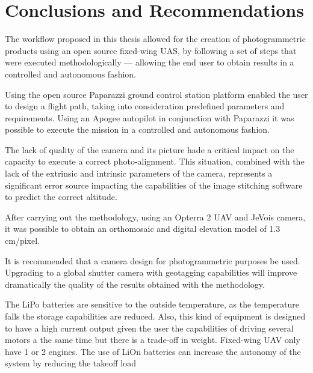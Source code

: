 \section{Conclusions and Recommendations}
The workflow proposed in this thesis allowed for the creation of photogrammetric products using an open source fixed-wing UAS, by following a set of steps that were executed methodologically — allowing the end user to obtain results in a controlled and autonomous fashion.

Using the open source Paparazzi ground control station platform enabled the user to design a flight path, taking into consideration predefined parameters and requirements. Using an Apogee autopilot in conjunction with Paparazzi it was possible to execute the mission in a controlled and autonomous fashion.

The lack of quality of the camera and its picture hade a critical impact on the capacity to execute a correct photo-alignment. This situation, combined with the lack of the extrinsic and intrinsic parameters of the camera, represents a significant error source impacting the capabilities of the image stitching software to predict the correct altitude.

 After carrying out the methodology, using an Opterra 2 UAV and JeVois camera, it was possible to obtain an orthomosaic and digital elevation model of 1.3 cm/pixel.
 

It is recommended that a camera design for photogrammetric purposes be used. Upgrading to a global shutter camera with geotagging capabilities will improve dramatically the quality of the results obtained with the methodology.

The LiPo batteries are sensitive to the outside temperature, as the temperature falls the storage capabilities are reduced. Also, this kind of equipment is designed to have a high current output given the user the capabilities of driving several motors a the same time but there is a trade-off in weight. Fixed-wing UAV only have 1 or 2 engines. The use of LiOn batteries can increase the autonomy of the system by reducing the takeoff load